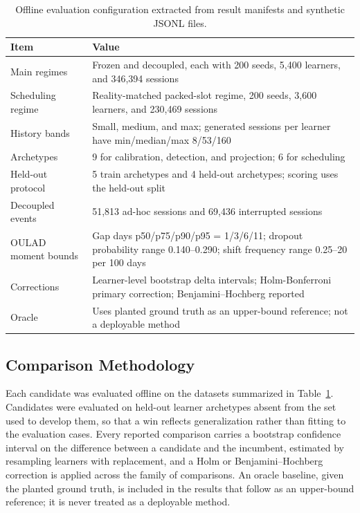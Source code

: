 \documentclass[conference]{IEEEtran}
\begin{document}
\begin{table}[!t]
\centering
\caption{Offline evaluation configuration extracted from result manifests and synthetic JSONL files.}
\label{tab:eval-config}
\scriptsize
\begin{tabular}{p{2.45cm} p{4.55cm}}
\toprule
\textbf{Item} & \textbf{Value} \\
\midrule
Main regimes & Frozen and decoupled, each with 200 seeds, 5{,}400 learners, and 346{,}394 sessions \\
Scheduling regime & Reality-matched packed-slot regime, 200 seeds, 3{,}600 learners, and 230{,}469 sessions \\
History bands & Small, medium, and max; generated sessions per learner have min/median/max 8/53/160 \\
Archetypes & 9 for calibration, detection, and projection; 6 for scheduling \\
Held-out protocol & 5 train archetypes and 4 held-out archetypes; scoring uses the held-out split \\
Decoupled events & 51{,}813 ad-hoc sessions and 69{,}436 interrupted sessions \\
OULAD moment bounds & Gap days p50/p75/p90/p95 = 1/3/6/11; dropout probability range 0.140--0.290; shift frequency range 0.25--20 per 100 days \\
Corrections & Learner-level bootstrap delta intervals; Holm-Bonferroni primary correction; Benjamini--Hochberg reported \\
Oracle & Uses planted ground truth as an upper-bound reference; not a deployable method \\
\bottomrule
\end{tabular}
\end{table}

\subsection{Comparison Methodology}
\label{sec:method-compare}
Each candidate was evaluated offline on the datasets summarized in Table~\ref{tab:eval-config}. Candidates were evaluated on held-out learner archetypes absent from the set used to develop them, so that a win reflects generalization rather than fitting to the evaluation cases. Every reported comparison carries a bootstrap confidence interval on the difference between a candidate and the incumbent, estimated by resampling learners with replacement, and a Holm or Benjamini--Hochberg correction is applied across the family of comparisons. An oracle baseline, given the planted ground truth, is included in the results that follow as an upper-bound reference; it is never treated as a deployable method.
\end{document}
